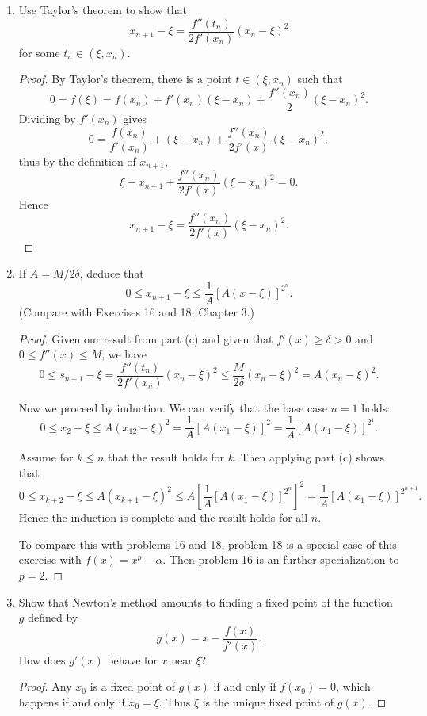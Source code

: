 \documentclass[12pt]{article}
\theoremstyle{remark}
\theoremstyle{named}
\renewcommand{\a}{\alpha}
\begin{document}
\begin{enumerate}
    \item Use Taylor's theorem to show that \[x_{n + 1} - \xi = \frac{f''(t_n)}{2 f'(x_n)}(x_n - \xi)^2\]
    for some \(t_n \in (\xi, x_n)\).

    \begin{proof}
        By Taylor's theorem, there is a point \(t \in (\xi, x_n)\) such that \[0 = f(\xi) = f(x_n) + f'(x_n)(\xi - x_n) + \frac{f''(x_n)}{2}(\xi - x_n)^2.\]
        Dividing by \(f'(x_n)\) gives
        \[0 = \frac{f(x_n)}{f'(x_n)} + (\xi - x_n) + \frac{f''(x_n)}{2f'(x)}(\xi - x_n)^2,\]
        thus by the definition of \(x_{n + 1}\),
        \[\xi - x_{n + 1} + \frac{f''(x_n)}{2f'(x)}(\xi - x_n)^2 = 0.\]
        Hence 
        \[x_{n + 1} - \xi = \frac{f''(x_n)}{2f'(x)}(\xi - x_n)^2.\]
    \end{proof}

    \item If \(A = M/2 \delta\), deduce that 
    \[0 \le x_{n + 1} - \xi \le \frac{1}{A}[A(x - \xi)]^{2^n}.\]
    (Compare with Exercises 16 and 18, Chapter 3.)
    \begin{proof}
        Given our result from part (c) and given that \(f'(x) \ge \delta > 0\) and \(0 \le f''(x) \le M\), we have 
        \[0 \le s_{n + 1} - \xi = \frac{f''(t_n)}{2f'(x_n)}(x_n - \xi)^2 \le \frac{M}{2\delta}(x_n - \xi)^2 = A(x_n - \xi)^2.\]

        Now we proceed by induction. We can verify that the base case \(n = 1\) holds:
        \[0 \le x_2 - \xi \le A(x_12 - \xi)^2 = \frac{1}{A}[A(x_1 - \xi)]^2 = \frac{1}{A}[A(x_1 - \xi)]^{2^1}.\]

        Assume for \(k \le n\) that the result holds for \(k\). Then applying part (c) shows that 
        \[0 \le x_{k + 2} - \xi \le A(x_{k + 1} - \xi)^2 \le A\left[\frac{1}{A}[A(x_1 - \xi)]^{2^n}\right]^2 = \frac{1}{A}[A(x_1 - \xi)]^{2^{n + 1}}.\]
        Hence the induction is complete and the result holds for all \(n\).

        To compare this with problems 16 and 18, problem 18 is a special case of this exercise with \(f(x) = x^p - \a\). Then problem 16 is an further specialization to \(p = 2\). 
    \end{proof}

    \item Show that Newton's method amounts to finding a fixed point of the function \(g\) defined by \[g(x) = x - \frac{f(x)}{f'(x)}.\]
    How does \(g'(x)\) behave for \(x\) near \(\xi\)?

    \begin{proof}
        Any \(x_0\) is a fixed point of \(g(x)\) if and only if \(f(x_0) = 0\), which happens if and only if \(x_0 = \xi\). Thus \(\xi\) is the unique fixed point of \(g(x)\).


\end{proof}
\end{enumerate}
\end{document}
